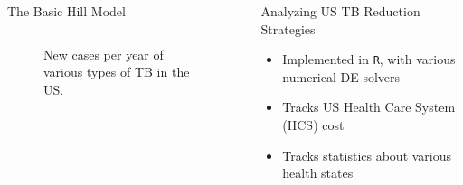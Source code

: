 \documentclass[final]{beamer}
\begin{document}
\begin{frame}
\begin{columns}[T]
\begin{column}{.3\textwidth}
\begin{block}{The Basic Hill Model}
\begin{columns}
\begin{column}{.47\textwidth}
\begin{figure}[h]
\begin{center}
              \end{center}
              \caption{New cases per year of various types of TB in the US.}
              \label{fig:incPlotTotal}
             \end{figure}
           \end{column}
         \end{columns}
       \end{block}
    \end{column}
    
    \begin{column}{.3\textwidth}
      \begin{block}{Analyzing US TB Reduction Strategies}
        \begin{itemize}
          \item Implemented in \texttt{R}, with various numerical DE solvers
          \item Tracks US Health Care System (HCS) cost
          \item Tracks statistics about various health states
        \end{itemize}
      \end{block}


\end{column}
\end{columns}
\end{frame}
\end{document}
